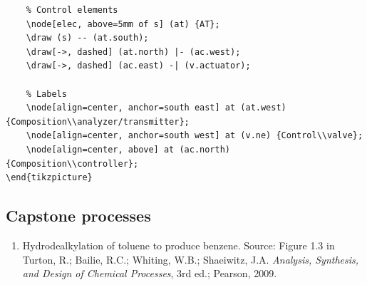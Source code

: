 \documentclass[11pt]{article}
\begin{document}
\begin{enumerate}[resume*]
\begin{lstlisting}
	% Control elements
	\node[elec, above=5mm of s] (at) {AT};
	\draw (s) -- (at.south);
	\draw[->, dashed] (at.north) |- (ac.west);
	\draw[->, dashed] (ac.east) -| (v.actuator);
	
	% Labels
	\node[align=center, anchor=south east] at (at.west) {Composition\\analyzer/transmitter};
	\node[align=center, anchor=south west] at (v.ne) {Control\\valve};
	\node[align=center, above] at (ac.north) {Composition\\controller};
\end{tikzpicture}			
	\end{lstlisting}

\end{enumerate}

\newpage
\subsection{Capstone processes}
\begin{enumerate}[resume*]
	\item Hydrodealkylation of toluene to produce benzene. Source: Figure 1.3 in Turton, R.; Bailie, R.C.; Whiting, W.B.; Shaeiwitz, J.A. \textit{Analysis, Synthesis, and Design of Chemical Processes}, 3rd ed.; Pearson, 2009. 
\end{enumerate}
\end{document}
